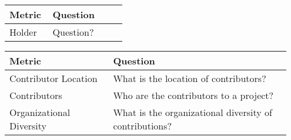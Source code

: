 \begin{table}[ht]
	\centering
	\begin{tabular}{| p{0.35\linewidth} | p{0.6\linewidth}|}
			\hline
			\hfil \textbf{Metric} & \hfil \textbf{Question} \\ 
			\hline
			Holder & Question? \\
			\hline
	\end{tabular}
\end{table}
	\begin{table}[ht]
	\centering
	\begin{tabular}{| p{0.35\linewidth} | p{0.6\linewidth} |}
		\hline
		\hfil \textbf{Metric}  & \hfil \textbf{Question} \\ 
		\hline		
		Contributor Location & What is the location of contributors? \\
		\hline
		Contributors & Who are the contributors to a project? \\
		\hline
		Organizational Diversity & What is the organizational diversity of 
		contributions? \\
		\hline
	\end{tabular}
\end{table}
